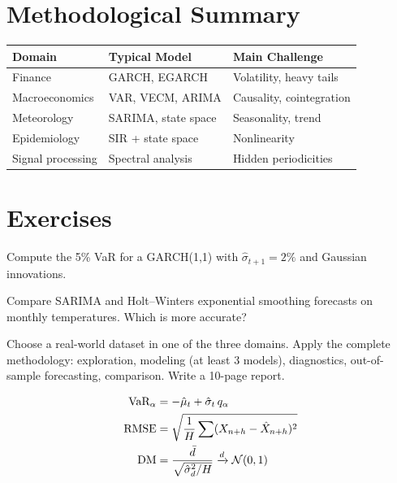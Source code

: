 \section{Methodological Summary}

\begin{center}
\begin{tabular}{lll}
\toprule
\textbf{Domain} & \textbf{Typical Model} & \textbf{Main Challenge} \\
\midrule
Finance & GARCH, EGARCH & Volatility, heavy tails \\
Macroeconomics & VAR, VECM, ARIMA & Causality, cointegration \\
Meteorology & SARIMA, state space & Seasonality, trend \\
Epidemiology & SIR + state space & Nonlinearity \\
Signal processing & Spectral analysis & Hidden periodicities \\
\bottomrule
\end{tabular}
\end{center}

\section{Exercises}

\begin{exercise}[$\star$]
Compute the 5\% VaR for a GARCH(1,1) with $\hat\sigma_{t+1}=2\%$ and Gaussian innovations.
\end{exercise}

\begin{exercise}[$\star\star$]
Compare SARIMA and Holt--Winters exponential smoothing forecasts on monthly temperatures. Which is more accurate?
\end{exercise}

\begin{exercise}
Choose a real-world dataset in one of the three domains. Apply the complete methodology: exploration, modeling (at least 3 models), diagnostics, out-of-sample forecasting, comparison. Write a 10-page report.
\end{exercise}

\begin{keyformulas}
\begin{align*}
\text{VaR}_\alpha &= -\hat\mu_t + \hat\sigma_t\,q_\alpha \\
\text{RMSE} &= \sqrt{\frac{1}{H}\sum(X_{n+h}-\hat{X}_{n+h})^2} \\
\text{DM} &= \frac{\bar{d}}{\sqrt{\hat\sigma_d^2/H}}\xrightarrow{d}\mathcal{N}(0,1)
\end{align*}
\end{keyformulas}
